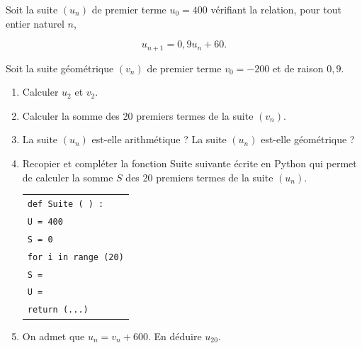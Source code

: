 \medskip

Soit la suite $\left(u_n\right)$ de premier terme $u_0= 400$ vérifiant la relation, pour tout entier naturel $n$,

\[u_{n+1} = 0,9u_n +60.\]

Soit la suite géométrique $\left(v_n\right)$ de premier terme $v_0= - 200$ et de raison $0,9$.

\medskip

\begin{enumerate}
\item Calculer $u_2$ et $v_2$.
\item Calculer la somme des 20 premiers termes de la suite $\left(v_n\right)$.
\item  La suite $\left(u_n\right)$ est-elle arithmétique ? La suite $\left(u_n\right)$ est-elle géométrique ?
\item  Recopier et compléter la fonction Suite suivante écrite en Python qui permet
de calculer la somme $S$ des 20 premiers termes de la suite $\left(u_n\right)$.

\begin{center}
\begin{tabularx}{0.4\linewidth}{|X|}\hline
\texttt{def Suite ( ) :}\\
\quad  \texttt{U = 400}\\
\quad \texttt{S = 0}\\
\quad \texttt{for i in range (20)}\\
\qquad \texttt{S = \dotfill}\\
\qquad \texttt{U = \dotfill}\\
\texttt{return (...)}\\\hline
\end{tabularx}
\end{center}

\item On admet que $u_n= v_n + 600$. En déduire $u_{20}$.
\end{enumerate}

\bigskip
